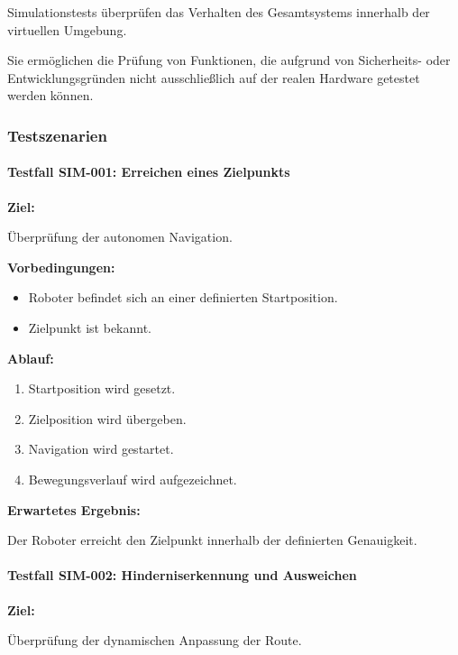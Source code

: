 Simulationstests überprüfen das Verhalten des Gesamtsystems innerhalb
der virtuellen Umgebung.

Sie ermöglichen die Prüfung von Funktionen, die aufgrund von
Sicherheits- oder Entwicklungsgründen nicht ausschließlich auf der
realen Hardware getestet werden können.

\subsubsection{Testszenarien}\label{testszenarien}

\paragraph{Testfall SIM-001: Erreichen eines
Zielpunkts}\label{testfall-sim-001-erreichen-eines-zielpunkts}

\textbf{Ziel:}

Überprüfung der autonomen Navigation.

\textbf{Vorbedingungen:}

\begin{itemize}
\tightlist
\item
  Roboter befindet sich an einer definierten Startposition.
\item
  Zielpunkt ist bekannt.
\end{itemize}

\textbf{Ablauf:}

\begin{enumerate}
\def\labelenumi{\arabic{enumi}.}
\tightlist
\item
  Startposition wird gesetzt.
\item
  Zielposition wird übergeben.
\item
  Navigation wird gestartet.
\item
  Bewegungsverlauf wird aufgezeichnet.
\end{enumerate}

\textbf{Erwartetes Ergebnis:}

Der Roboter erreicht den Zielpunkt innerhalb der definierten
Genauigkeit.

\paragraph{Testfall SIM-002: Hinderniserkennung und
Ausweichen}\label{testfall-sim-002-hinderniserkennung-und-ausweichen}

\textbf{Ziel:}

Überprüfung der dynamischen Anpassung der Route.

